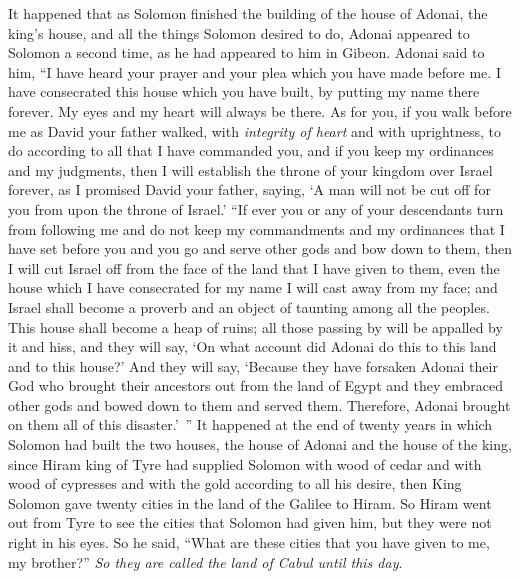 \begin{biblechapter} %
 It happened that as Solomon finished the building of the house of Adonai, the king’s house, and all the things Solomon desired to do,
\verse Adonai appeared to Solomon a second time, as he had appeared to him in Gibeon.
\verse Adonai said to him, “I have heard your prayer and your plea which you have made before me. I have consecrated this house which you have built, by putting my name there forever. My eyes and my heart will always be there.
\verse As for you, if you walk before me as David your father walked, with \textit{integrity of heart} and with uprightness, to do according to all that I have commanded you, and if you keep my ordinances and my judgments,
\verse then I will establish the throne of your kingdom over Israel forever, as I promised David your father, saying, ‘A man will not be cut off for you from upon the throne of Israel.’
\verse “If ever you or any of your descendants turn from following me and do not keep my commandments and my ordinances that I have set before you and you go and serve other gods and bow down to them,
\verse then I will cut Israel off from the face of the land that I have given to them, even the house which I have consecrated for my name I will cast away from my face; and Israel shall become a proverb and an object of taunting among all the peoples.
\verse This house shall become a heap of ruins; all those passing by will be appalled by it and hiss, and they will say, ‘On what account did Adonai do this to this land and to this house?’
\verse And they will say, ‘Because they have forsaken Adonai their God who brought their ancestors out from the land of Egypt and they embraced other gods and bowed down to them and served them. Therefore, Adonai brought on them all of this disaster.’ ”
 It happened at the end of twenty years in which Solomon had built the two houses, the house of Adonai and the house of the king,
\verse since Hiram king of Tyre had supplied Solomon with wood of cedar and with wood of cypresses and with the gold according to all his desire, then King Solomon gave twenty cities in the land of the Galilee to Hiram.
\verse So Hiram went out from Tyre to see the cities that Solomon had given him, but they were not right in his eyes.
\verse So he said, “What are these cities that you have given to me, my brother?” \textit{So they are called the land of Cabul until this day}.

\end{biblechapter}

